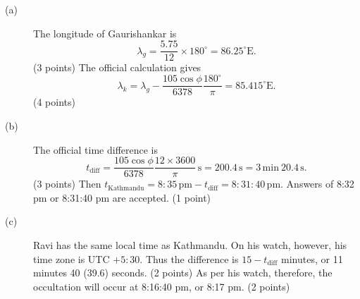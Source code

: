 \begin{description}
\item[(a)] The longitude of Gaurishankar is
\[\lambda_g=\frac{5.75}{12}\times180^\circ=86.25^\circ\mathrm E.\]
\hfill(3 points)
The official calculation gives
\[\lambda_k=\lambda_g-\frac{105\cos\phi}{6378}\frac{180^\circ}{\pi}=85.415^\circ\mathrm E.\]
\hfill(4 points)
\item[(b)] The official time difference is
\[t_{\mathrm{diff}}=\frac{105\cos\phi}{6378}\frac{12\times3600}{\pi}\,\mathrm s=200.4\,\mathrm s=3\,\mathrm{min}\ 20.4\,\mathrm s.\]
\hfill(3 points)
Then $t_{\mathrm{Kathmandu}}=8{:}35\,\mathrm{pm}-t_{\mathrm{diff}}=8{:}31{:}40\,\mathrm{pm}$. Answers of 8:32 pm or 8:31:40 pm are accepted. \hfill(1 point)
\item[(c)] Ravi has the same local time as Kathmandu. On his watch, however, his time zone is UTC $+5{:}30$. Thus the difference is $15-t_{\mathrm{diff}}$ minutes, or 11 minutes 40 (39.6) seconds. \hfill(2 points)
As per his watch, therefore, the occultation will occur at 8:16:40 pm, or 8:17 pm. \hfill(2 points)
\end{description}
